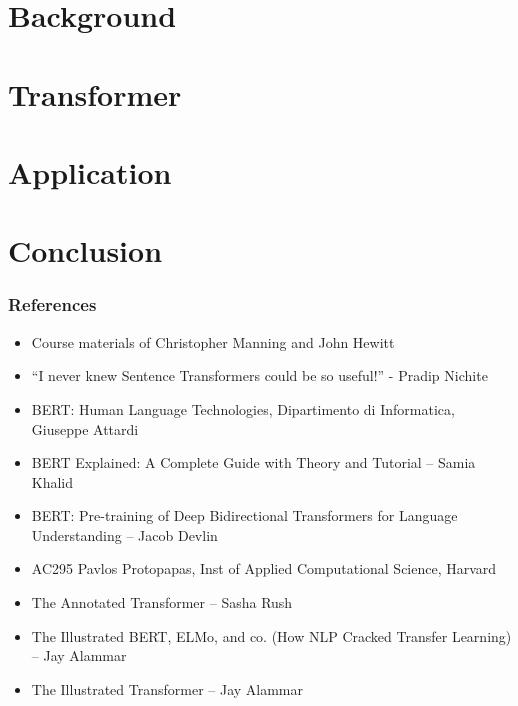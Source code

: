 \section[Back]{Background}


\section[Trs]{Transformer}


% 

% 

% 

\section[Appln]{Application}


\section[Cncl]{Conclusion}


\begin{frame}[fragile]\frametitle{References}
		\begin{itemize}
		\item Course materials of Christopher Manning and John Hewitt
		\item ``I never knew Sentence Transformers could be so useful!'' - Pradip Nichite
		\item BERT: Human Language Technologies, Dipartimento di Informatica, Giuseppe Attardi
		\item BERT Explained: A Complete Guide with Theory and Tutorial – Samia Khalid
		\item BERT: Pre-training of Deep Bidirectional Transformers for Language Understanding – Jacob Devlin
		\item AC295 Pavlos Protopapas, Inst of Applied Computational Science, Harvard
		\item The Annotated Transformer – Sasha Rush
		\item The Illustrated BERT, ELMo, and co. (How NLP Cracked Transfer Learning) – Jay Alammar
		\item The Illustrated Transformer – Jay Alammar
		\end{itemize}
\end{frame}

